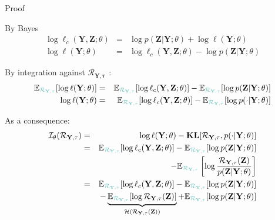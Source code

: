 \documentclass[compress,10pt]{beamer}
\newcommand{\bX}{\mathbf{Y}}
\newcommand{\Xall}{\mathbf{Y}}
\newcommand{\btau}{\mathbf{\tau}}
\newcommand{\bZ}{\mathbf{Z}}
\begin{document}
 \begin{frame}{Proof}

By Bayes
\begin{eqnarray*}
\log \ell_c(\bX,\bZ; \theta)&=& \log  p(\bZ | \Xall; \theta) +   \log \ell(\Xall ; \theta)   \\
 \log \ell(\Xall ; \theta) &=& \log \ell_c(\bX,\bZ; \theta) -  \log  p(\bZ | \Xall; \theta)
\end{eqnarray*}

By integration against $\mathcal{R}_{\Xall,\btau}$ : 
\begin{eqnarray*}
 \mathbb{E}_{\color{dgreen}\mathcal{R}_{\Xall,\btau}} [ \log  \ell(\Xall ; \theta)] &=&  \mathbb{E}_{\color{dgreen}\mathcal{R}_{\Xall,\btau}} [\log \ell_c(\bX,\bZ; \theta)] -  \mathbb{E}_{\color{dgreen}\mathcal{R}_{\Xall,\btau}} [ \log  p(\bZ | \Xall; \theta)] \\
 \log \ell(\Xall ; \theta) &=&  \mathbb{E}_{\color{dgreen}\mathcal{R}_{\Xall,\btau}} [\log \ell_c(\bX,\bZ; \theta)] -  \mathbb{E}_{\color{dgreen}\mathcal{R}_{\Xall,\btau}} [ \log  p(\cdot | \Xall; \theta)]
\end{eqnarray*}

As a consequence: 
\begin{eqnarray*}
\mathcal{I}_{\theta}(\mathcal{R}_{\Xall,\btau}) &=& \log \ell(\Xall ; \theta) -   \mathbf{KL}[\mathcal{R}_{\Xall,\btau}, p(\cdot | \Xall; \theta)] \\
 &=& \mathbb{E}_{\color{dgreen}\mathcal{R}_{\Xall,\btau}} [\log \ell_c(\bX,\bZ; \theta)] -  \mathbb{E}_{\color{dgreen}\mathcal{R}_{\Xall,\btau}} [ \log  p(\bZ | \Xall; \theta)] \\
&& -   \mathbb{E}_{\color{dgreen}\mathcal{R}_{\Xall,\btau}} \left[\log \frac{\mathcal{R}_{\Xall,\btau}(\bZ)} { p(\bZ | \Xall; \theta)}\right]\\
&=&  \mathbb{E}_{\color{dgreen}\mathcal{R}_{\Xall,\btau}} [\log \ell_c(\bX,\bZ; \theta)] -  \mathbb{E}_{\color{dgreen}\mathcal{R}_{\Xall,\btau}} [ \log  p(\bZ | \Xall; \theta)] \\
&& -   \underbrace{\mathbb{E}_{\color{dgreen}\mathcal{R}_{\Xall,\btau}} [\log \mathcal{R}_{\Xall,\btau}(\bZ)]}_{  \mathcal{H}\left(\mathcal{R}_{\Xall,\btau}(\bZ)\right) } +  \mathbb{E}_{\color{dgreen}\mathcal{R}_{\Xall,\btau}} [\log p(\bZ | \Xall; \theta)]
\end{eqnarray*}




  \end{frame}
\end{document}

